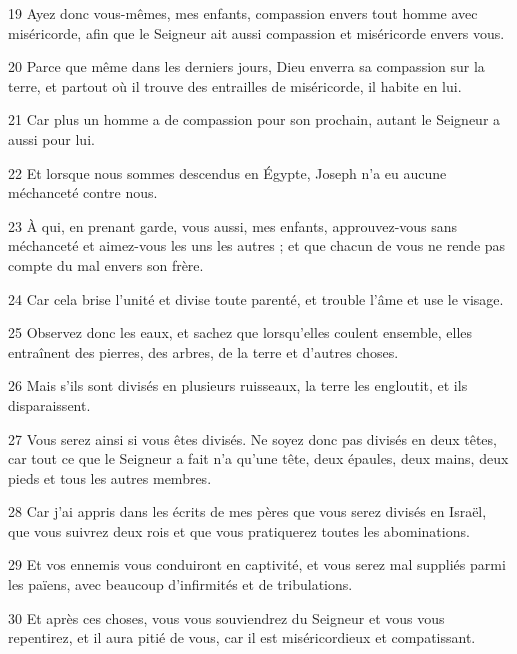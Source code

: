 \par 19 Ayez donc vous-mêmes, mes enfants, compassion envers tout homme avec miséricorde, afin que le Seigneur ait aussi compassion et miséricorde envers vous.

\par 20 Parce que même dans les derniers jours, Dieu enverra sa compassion sur la terre, et partout où il trouve des entrailles de miséricorde, il habite en lui.

\par 21 Car plus un homme a de compassion pour son prochain, autant le Seigneur a aussi pour lui.

\par 22 Et lorsque nous sommes descendus en Égypte, Joseph n'a eu aucune méchanceté contre nous.

\par 23 À qui, en prenant garde, vous aussi, mes enfants, approuvez-vous sans méchanceté et aimez-vous les uns les autres ; et que chacun de vous ne rende pas compte du mal envers son frère.

\par 24 Car cela brise l'unité et divise toute parenté, et trouble l'âme et use le visage.

\par 25 Observez donc les eaux, et sachez que lorsqu'elles coulent ensemble, elles entraînent des pierres, des arbres, de la terre et d'autres choses.

\par 26 Mais s'ils sont divisés en plusieurs ruisseaux, la terre les engloutit, et ils disparaissent.

\par 27 Vous serez ainsi si vous êtes divisés. Ne soyez donc pas divisés en deux têtes, car tout ce que le Seigneur a fait n'a qu'une tête, deux épaules, deux mains, deux pieds et tous les autres membres.

\par 28 Car j'ai appris dans les écrits de mes pères que vous serez divisés en Israël, que vous suivrez deux rois et que vous pratiquerez toutes les abominations.

\par 29 Et vos ennemis vous conduiront en captivité, et vous serez mal suppliés parmi les païens, avec beaucoup d'infirmités et de tribulations.

\par 30 Et après ces choses, vous vous souviendrez du Seigneur et vous vous repentirez, et il aura pitié de vous, car il est miséricordieux et compatissant.

